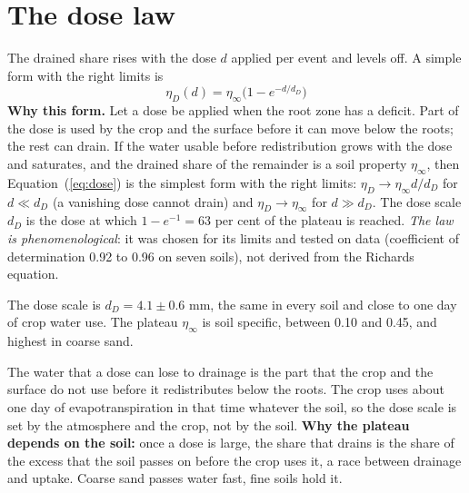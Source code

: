 \section{The dose law}
The drained share rises with the dose $d$ applied per event and levels off. A simple form with the right limits is
\begin{equation}\label{eq:dose}\boxed{\boxed{\;\eta_D(d)=\eta_\infty\bigl(1-e^{-d/d_D}\bigr)\;}}\end{equation}
\textbf{Why this form.} Let a dose be applied when the root zone has a deficit. Part of the dose is used by the crop and the surface before it can move below the roots; the rest can drain. If the water usable before redistribution grows with the dose and saturates, and the drained share of the remainder is a soil property $\eta_\infty$, then Equation~(\ref{eq:dose}) is the simplest form with the right limits: $\eta_D\to\eta_\infty d/d_D$ for $d\ll d_D$ (a vanishing dose cannot drain) and $\eta_D\to\eta_\infty$ for $d\gg d_D$. The dose scale $d_D$ is the dose at which $1-e^{-1}=63$ per cent of the plateau is reached. \emph{The law is phenomenological}: it was chosen for its limits and tested on data (coefficient of determination 0.92 to 0.96 on seven soils), not derived from the Richards equation.

 The dose scale is $d_D=4.1\pm0.6$ mm, the same in every soil and close to one day of crop water use. The plateau $\eta_\infty$ is soil specific, between 0.10 and 0.45, and highest in coarse sand.

 The water that a dose can lose to drainage is the part that the crop and the surface do not use before it redistributes below the roots. The crop uses about one day of evapotranspiration in that time whatever the soil, so the dose scale is set by the atmosphere and the crop, not by the soil. \textbf{Why the plateau depends on the soil:} once a dose is large, the share that drains is the share of the excess that the soil passes on before the crop uses it, a race between drainage and uptake. Coarse sand passes water fast, fine soils hold it.





